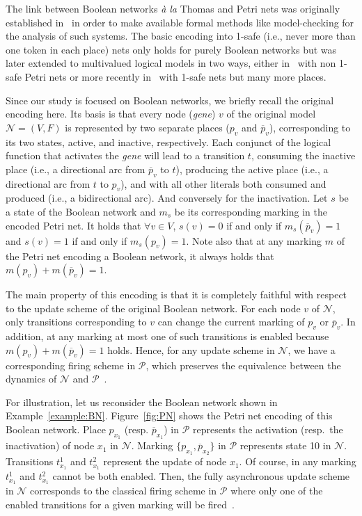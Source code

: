 \documentclass[preprint,12pt]{elsarticle}
\begin{document}
The link between Boolean networks \emph{à la} Thomas and Petri nets was originally established in~\cite{chaouiya2004qualitative} in order to make available formal methods like model-checking for the analysis of such systems.
The basic encoding into 1-safe (i.e., never more than one token in each place) nets only holds for purely Boolean networks but was later extended to multivalued logical models in two ways, either in~\cite{chaouiya2011petri} with non 1-safe Petri nets or more recently in~\cite{chatain2014characterization} with 1-safe nets but many more places.

Since our study is focused on Boolean networks, we briefly recall the original encoding here.
Its basis is that every node (\emph{gene}) \(v\) of the original model \(\mathcal{N} = (V, F)\) is represented by two separate places (\(p_v\) and \(\overline{p}_v\)), corresponding to its two states, active, and inactive, respectively.
Each conjunct of the logical function that activates the \emph{gene} will lead to a transition \(t\), consuming the inactive place (i.e., a directional arc from \(\overline{p}_v\) to \(t\)), producing the active place (i.e., a directional arc from \(t\) to \(p_v\)), and with all other literals both consumed and produced (i.e., a bidirectional arc).
And conversely for the inactivation.
Let \(s\) be a state of the Boolean network and \(m_s\) be its corresponding marking in the encoded Petri net.
It holds that \(\forall v \in V\), \(s(v) = 0\) if and only if \(m_s(\overline{p}_v) = 1\) and \(s(v) = 1\) if and only if \(m_s(p_v) = 1\). Note also that at any marking \(m\) of the Petri net encoding a Boolean network, it always holds that \(m(p_v) + m(\overline{p}_v) = 1\).

The main property of this encoding is that it is completely faithful with respect to the update scheme of the original Boolean network.
For each node \(v\) of \(\mathcal{N}\), only transitions corresponding to \(v\) can change the current marking of \(p_v\) or \(\overline{p}_v\).
In addition, at any marking at most one of such transitions is enabled because \(m(p_v) + m(\overline{p}_v) = 1\) holds.
Hence, for any update scheme in \(\mathcal{N}\), we have a corresponding firing scheme in \(\mathcal{P}\), which preserves the equivalence between the dynamics of \(\mathcal{N}\) and \(\mathcal{P}\)~\cite{DBLP:journals/nc/ChatainHKPT20}.

For illustration, let us reconsider the Boolean network shown in Example~\ref{example:BN}.
Figure~\ref{fig:PN} shows the Petri net encoding of this Boolean network.
Place \(p_{x_1}\) (resp. \(\overline{p}_{x_1}\)) in \(\mathcal{P}\) represents the activation (resp.\ the inactivation) of node \(x_1\) in \(\mathcal{N}\).
Marking \(\{p_{x_1}, \overline{p}_{x_2}\}\) in \(\mathcal{P}\) represents state 10 in \(\mathcal{N}\).
Transitions \(t^{1}_{x_1}\) and \(t^{2}_{x_1}\) represent the update of node \(x_1\).
Of course, in any marking \(t^{1}_{x_1}\) and \(t^{2}_{x_1}\) cannot be both enabled.
Then, the fully asynchronous update scheme in \(\mathcal{N}\) corresponds to the classical firing scheme in \(\mathcal{P}\) where only one of the enabled transitions for a given marking will be fired~\cite{Murata1989}.
\end{document}
